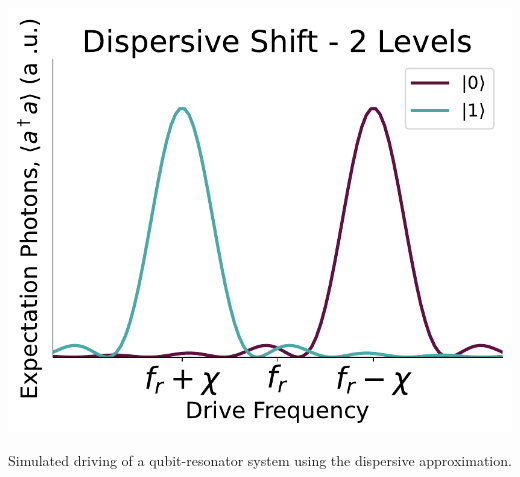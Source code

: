 \begin{marginfigure}
    \centering
    \includegraphics[]{Simulations/readout_simulations/dispersive_shift_2_level.pdf}
    \caption{Simulated driving of a qubit-resonator system using the dispersive approximation.}
    \label{fig:dispersive_two_level_qubit}
\end{marginfigure}

